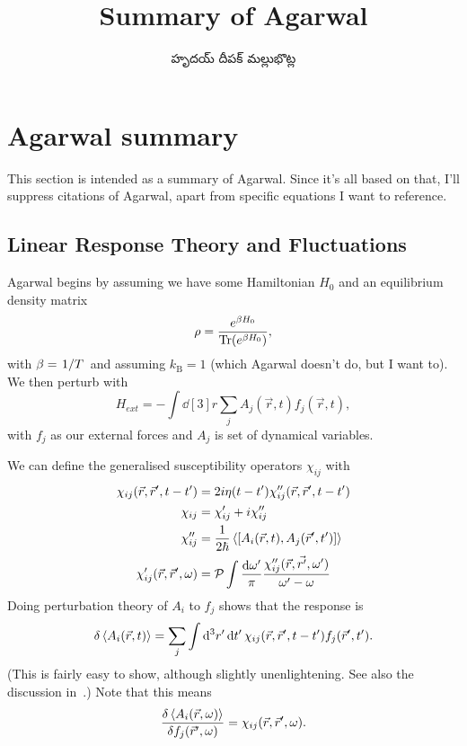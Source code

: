 \documentclass[../main.tex]{subfiles}
\title{Summary of Agarwal}
\author{\begin{telugu}హృదయ్ దీపక్ మల్లుభొట్ల\end{telugu}}
\date{}
\newcommand{\kb}{k_{\mathrm{B}}}
\begin{document}
\onlyinsubfile{\maketitle}
\section{Agarwal summary}\label{sec:AgarwalSummary}

This section is intended as a summary of Agarwal\supercite{Agarwal}.
Since it's all based on that, I'll suppress citations of Agarwal, apart from specific equations I want to reference.

\subsection{Linear Response Theory and Fluctuations} \label{subsec:LrtF}

	Agarwal begins by assuming we have some Hamiltonian $H_0$ and an equilibrium density matrix
	\begin{equation}
		\rho = \frac{e^{\beta H_0}}{\Tr(e^{\beta H_0})},
	\end{equation}
	with $\beta = \flatfrac{1}{T}$ and assuming $\kb = 1$ (which Agarwal doesn't do, but I want to).
	We then perturb with
	\begin{equation}
		H_{ext} = - \int \dd[3]{r} \sum_j A_j(\vec{r}, t) f_j(\vec{r}, t),
	\end{equation}
	with $f_j$ as our external forces and $A_j$ is set of dynamical variables.

	We can define the generalised susceptibility operators $\chi_{ij}$ with
	\begin{align}
		\chi_{ij}(\vec{r}, \vec{r}', t - t') &= 2 i \eta(t - t') \chi''_{ij}(\vec{r}, \vec{r}', t - t') \\
		\chi_{ij} &= \chi'_{ij} + i \chi''_{ij} \\
		\chi''_{ij} &= \frac{1}{2\hbar} \ev{\comm{A_i(\vec{r}, t)}{A_j(\vec{r}', t')}} \\
		\chi'_{ij}(\vec{r}, \vec{r}', \omega) &= \mathcal{P} \int \frac{\dd{\omega'}}{\pi} \frac{\chi''_{ij}(\vec{r}, \vec{r'}, \omega')}{\omega' - \omega}
	\end{align}
	Doing perturbation theory of $A_i$ to $f_j$ shows that the response is
	\begin{equation}
		\delta \ev{A_i(\vec{r}, t)} = \sum_j \int \dd[3]{r'} \dd{t'} \chi_{ij}(\vec{r}, \vec{r}', t - t') f_j(\vec{r}', t').
	\end{equation}
	(This is fairly easy to show, although slightly unenlightening.
	See also the discussion in~\cite{Giuliani2005}.)
	Note that this means
	\begin{equation}
		\fdv{\ev{A_i(\vec{r}, \omega)}}{f_j(\vec{r}', \omega)} = \chi_{ij}(\vec{r}, \vec{r}', \omega).
	\end{equation}
\end{document}
